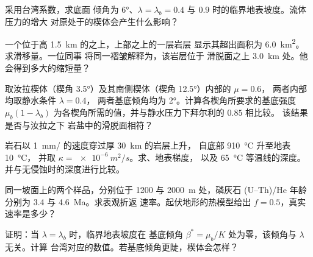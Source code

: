 \begin{exercise}[$\star\star$]\label{exo:b3:orogenic-wedges:5}
采用台湾系数，求底面
倾角为 \ang{6}、$\lambda = \lambda_b = 0.4$ 与 $0.9$ 时的临界地表坡度。流体压力的增大
对原处于的楔体会产生什么影响？
\end{exercise}

\begin{exercise}[$\star\star$]\label{exo:b3:orogenic-wedges:6}
一个位于高 \qty{1.5}{km} 的之上，上部之上的一层岩层
显示其超出面积为 \qty{6.0}{km^2}。求滑移量。一位同事
将同一褶皱解释为，该岩层位于
滑脱面之上 \qty{3.0}{km} 处。他会得到多大的缩短量？
\end{exercise}

\begin{exercise}[$\star\star$]\label{exo:b3:orogenic-wedges:7}
取汝拉楔体（楔角 \ang{3.5}）及其南侧楔体（楔角 \ang{12.5}）内部的 $\mu = 0.6$，
两者内部均取静水条件 $\lambda = 0.4$，
两者基底倾角均为 \ang{2}。计算各楔角所要求的基底强度 $\mu_b(1 -
\lambda_b)$ 为各楔角所需的值，并与静水压力下拜尔利的 $0.85$ 相比较。
该结果是否与汝拉之下
岩盐中的滑脱面相符？
\end{exercise}

\begin{exercise}[$\star\star$]\label{exo:b3:orogenic-wedges:8}
岩石以 \qty{1}{mm/} 的速度穿过厚 \qty{30}{km} 的岩层上升，
自底部 \qty{910}{\celsius} 升至地表 \qty{10}{\celsius}，
并取 $\kappa = \qty{e-6}{m^2/s}$。求、地表梯度，
以及 \qty{65}{\celsius} 等温线的深度。
并与无侵蚀时的深度进行比较。
\end{exercise}

\begin{exercise}[$\star\star$]\label{exo:b3:orogenic-wedges:9}
同一坡面上的两个样品，分别位于 1200 与 \qty{2000}{m} 处，磷灰石
(U--Th)/He 年龄分别为 3.4 与 \qty{4.6}{Ma}。求表观折返
速率。起伏地形的热模型给出 $f = 0.5$，真实速率是多少？
\end{exercise}

\begin{exercise}[$\star\star\star$]\label{exo:b3:orogenic-wedges:10}
证明：当 $\lambda = \lambda_b$ 时，临界地表坡度在
基底倾角 $\beta^* = \mu_b/K$ 处为零，该倾角与 $\lambda$ 无关。计算
台湾对应的数值。若基底倾角更陡，楔体会怎样？
\end{exercise}


